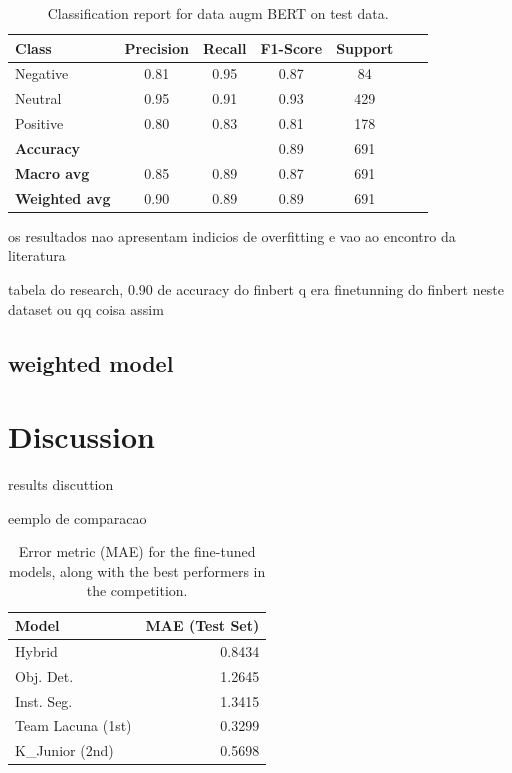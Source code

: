 \documentclass[conference]{IEEEtran}
\begin{document}
\begin{table}[H]
\centering
\caption{Classification report for data augm BERT on test data.}
\label{cr_augmbert_test}
\begin{tabular}{lcccccc}
\toprule
\textbf{Class} & \textbf{Precision} & \textbf{Recall} & \textbf{F1-Score} & \textbf{Support} \\
\midrule
Negative & 0.81 & 0.95 & 0.87 & 84 \\
Neutral & 0.95 & 0.91 & 0.93 & 429 \\
Positive & 0.80 & 0.83 & 0.81 & 178 \\
\midrule
\textbf{Accuracy} &  &  & 0.89 & 691 \\
\textbf{Macro avg} & 0.85 & 0.89 & 0.87 & 691 \\
\textbf{Weighted avg} & 0.90 & 0.89 & 0.89 & 691 \\
\bottomrule
\end{tabular}
\end{table}

os resultados nao apresentam indicios de overfitting e vao ao encontro da literatura

tabela do research, 0.90 de accuracy do finbert q era finetunning do finbert neste dataset ou qq coisa assim



\subsection{weighted model}












\section{Discussion}

results discuttion

eemplo de comparacao

\begin{table}[H]
\centering
\caption{Error metric (MAE) for the fine-tuned models, along with the best performers in the competition.}
\label{tab:model02_results_transposed}
\begin{tabular}{lr}
\toprule
\textbf{Model} & \textbf{MAE (Test Set)} \\
\midrule
Hybrid & 0.8434 \\
Obj. Det. & 1.2645 \\
Inst. Seg. & 1.3415 \\
Team Lacuna (1st) & 0.3299 \\
K\_Junior (2nd) & 0.5698 \\
\bottomrule
\end{tabular}
\end{table}
\end{document}
